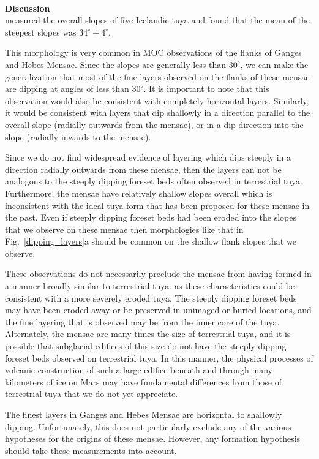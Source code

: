 \documentclass{lpscabs}
\begin{document}
\begin{abstracttext}
~\\
\textbf{Discussion}\\

\citet{1979JGR....84.8048A} measured the overall slopes of five
Icelandic tuya and found that the mean of the steepest slopes was
$34^{\circ}\pm4^{\circ}$.  

This morphology is very common in MOC observations of the flanks
of Ganges and Hebes Mensae.  Since the slopes are generally less
than $30^{\circ}$,
we can make the generalization that most of the fine layers observed
on the flanks of these mensae are dipping at angles of less than
$30^{\circ}$.  It is important to note that this observation would
also be consistent with completely horizontal layers.  Similarly,
it would be consistent with layers that dip shallowly in a direction
parallel to the overall slope (radially outwards from the mensae),
or in a dip direction into the slope (radially inwards to the
mensae).

Since we do not find widespread evidence of layering which dips
steeply in a direction radially outwards from these mensae, then the
layers can not be analogous to the steeply dipping foreset beds
often observed in terrestrial tuya.  Furthermore, the mensae have
relatively shallow slopes overall which is inconsistent with the ideal
tuya form that has been proposed for these mensae in the past.  Even
if steeply dipping foreset beds had been eroded into the slopes
that we observe on these mensae then morphologies like that in
Fig.~\ref{dipping_layers}a should be common on the shallow flank
slopes that we observe.

These observations do not necessarily preclude the mensae from
having formed in a manner broadly similar to terrestrial tuya.  as
these characteristics could be consistent with a more severely
eroded tuya.
The steeply dipping foreset beds may have been eroded away or be
preserved in unimaged or buried locations, and the fine layering
that is observed may be from the inner core of the tuya.  Alternately,
the mensae are many times the size of terrestrial tuya, and it is
possible that subglacial edifices of this size do not have the
steeply dipping foreset beds observed on terrestrial tuya.  In this
manner, the physical processes of volcanic construction of such a
large edifice beneath and through many kilometers of ice on Mars
may have fundamental differences from those of terrestrial tuya
that we do not yet appreciate.

The finest layers in Ganges and Hebes Mensae are horizontal to
shallowly dipping.  Unfortunately, this does not particularly exclude
any of the various hypotheses for the origins of these mensae.
However, any formation hypothesis should take these measurements into
account.


\end{abstracttext}
\end{document}

